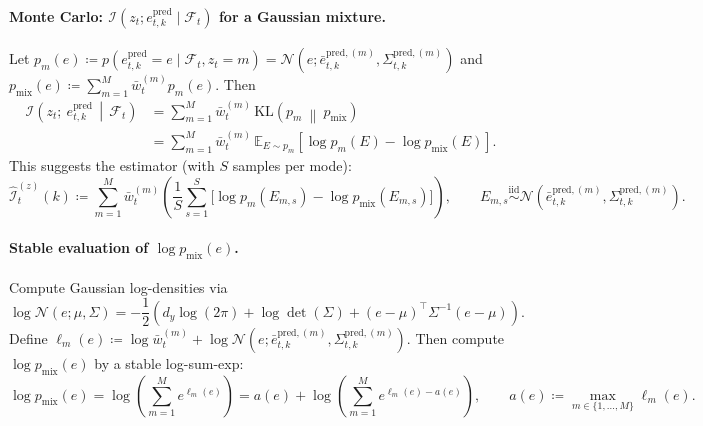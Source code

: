 \paragraph{Monte Carlo: \(\mathcal{I}(z_t;e_{t,k}^{\mathrm{pred}}\mid\mathcal{F}_t)\) for a Gaussian mixture.}
Let \(p_m(e)\coloneqq p(e_{t,k}^{\mathrm{pred}}=e\mid \mathcal{F}_t,z_t=m)=\mathcal{N}(e;\bar e_{t,k}^{\mathrm{pred},(m)},\Sigma_{t,k}^{\mathrm{pred},(m)})\) and
\(
p_{\mathrm{mix}}(e)\coloneqq \sum_{m=1}^M \bar{w}_t^{(m)}p_m(e).
\)
Then
\begin{align}
\label{eq:exp_iz_mc}
\mathcal{I}\!\left(z_t;\ e_{t,k}^{\mathrm{pred}}\,\middle|\,\mathcal{F}_t\right)
&=
\sum_{m=1}^M \bar{w}_t^{(m)}\,\mathrm{KL}\!\left(p_m\ \middle\|\ p_{\mathrm{mix}}\right)\\
&=
\sum_{m=1}^M \bar{w}_t^{(m)}\,
\mathbb{E}_{E\sim p_m}\!\left[\log p_m(E)-\log p_{\mathrm{mix}}(E)\right].
\end{align}
This suggests the estimator (with \(S\) samples per mode):
\begin{equation}
\label{eq:exp_iz_estimator}
\widehat{\mathcal{I}}_t^{(z)}(k)
\coloneqq
\sum_{m=1}^M \bar{w}_t^{(m)}\left(\frac{1}{S}\sum_{s=1}^S \Big[\log p_m(E_{m,s})-\log p_{\mathrm{mix}}(E_{m,s})\Big]\right),
\qquad
E_{m,s}\overset{\text{iid}}{\sim}\mathcal{N}(\bar e_{t,k}^{\mathrm{pred},(m)},\Sigma_{t,k}^{\mathrm{pred},(m)}).
\end{equation}

\paragraph{Stable evaluation of \(\log p_{\mathrm{mix}}(e)\).}
Compute Gaussian log-densities via
\begin{equation}
\label{eq:exp_logpdf_gauss}
\log \mathcal{N}(e;\mu,\Sigma)
=
-\frac12\left(d_y\log(2\pi)+\log\det(\Sigma)+(e-\mu)^\top \Sigma^{-1}(e-\mu)\right).
\end{equation}
Define \(\ell_m(e)\coloneqq \log \bar{w}_t^{(m)}+\log \mathcal{N}(e;\bar e_{t,k}^{\mathrm{pred},(m)},\Sigma_{t,k}^{\mathrm{pred},(m)})\).
Then compute \(\log p_{\mathrm{mix}}(e)\) by a stable log-sum-exp:
\begin{equation}
\label{eq:exp_logmix_lse}
\log p_{\mathrm{mix}}(e)
=
\log\!\left(\sum_{m=1}^M e^{\ell_m(e)}\right)
=
a(e)+\log\!\left(\sum_{m=1}^M e^{\ell_m(e)-a(e)}\right),
\qquad
a(e)\coloneqq \max_{m\in\{1,\dots,M\}} \ell_m(e).
\end{equation}

